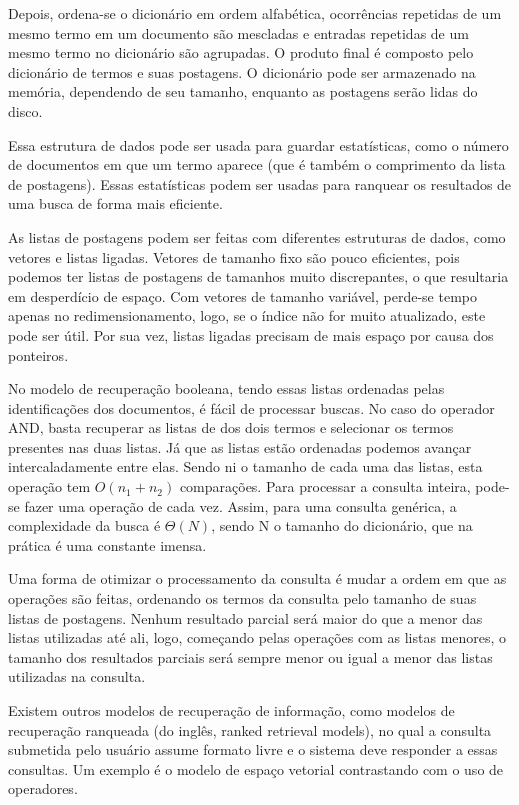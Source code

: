 Depois, ordena-se o dicionário em ordem alfabética, ocorrências repetidas de um mesmo termo em um documento são mescladas e entradas repetidas de um mesmo termo no dicionário são agrupadas. O produto final é composto pelo dicionário de termos e suas postagens. O dicionário pode ser armazenado na memória, dependendo de seu tamanho, enquanto as postagens serão lidas do disco.

Essa estrutura de dados pode ser usada para guardar estatísticas, como o número de documentos em que um termo aparece (que é também o comprimento da lista de postagens). Essas estatísticas podem ser usadas para ranquear os resultados de uma busca de forma mais eficiente.

As listas de postagens podem ser feitas com diferentes estruturas de dados, como vetores e listas ligadas. Vetores de tamanho fixo são pouco eficientes, pois podemos ter listas de postagens de tamanhos muito discrepantes, o que resultaria em desperdício de espaço. Com vetores de tamanho variável, perde-se tempo apenas no redimensionamento, logo, se o índice não for muito atualizado, este pode ser útil. Por sua vez, listas ligadas precisam de mais espaço por causa dos ponteiros.

No modelo de recuperação booleana, tendo essas listas ordenadas pelas identificações dos documentos, é fácil de processar buscas. No caso do operador AND, basta recuperar as listas de dos dois termos e selecionar os termos presentes nas duas listas. Já que as listas estão ordenadas podemos avançar intercaladamente entre elas. Sendo ni o tamanho de cada uma das listas, esta operação tem $O(n_{1}+n_{2})$ comparações. Para processar a consulta inteira, pode-se fazer uma operação de cada vez. Assim, para uma consulta genérica, a complexidade da busca é $\Theta(N)$, sendo N o tamanho do dicionário, que na prática é uma constante imensa.

Uma forma de otimizar o processamento da consulta é mudar a ordem em que as operações são feitas, ordenando os termos da consulta pelo tamanho de suas listas de postagens. Nenhum resultado parcial será maior do que a menor das listas utilizadas até ali, logo, começando pelas operações com as listas menores, o tamanho dos resultados parciais será sempre menor ou igual a menor das listas utilizadas na consulta.

Existem outros modelos de recuperação de informação, como modelos de recuperação ranqueada (do inglês, ranked retrieval models), no qual a consulta submetida pelo usuário assume formato livre e o sistema deve responder a essas consultas. Um exemplo é o modelo de espaço vetorial contrastando com o uso de operadores.
